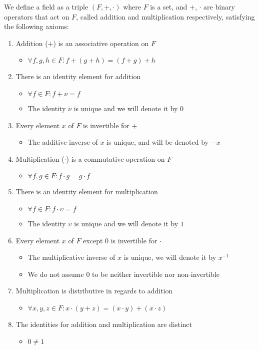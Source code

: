 \documentclass{article}
\begin{document}
We define a field as a triple $(F,+,\cdot)$ where $F$ is a set, and $+$, $\cdot$
are binary operators that act on $F$, called addition and multiplication
respectively, satisfying the following axioms\cite{field}:
\begin{enumerate}
  \item Addition ($+$) is an associative operation on $F$
  \begin{itemize}
    \item $\forall f,g,h \in F : f+(g+h) = (f+g)+h$
  \end{itemize}
  \item There is an identity element for addition
  \begin{itemize}
    \item $\forall f \in F: f + \nu = f$
    \item The identity $\nu$ is unique and we will denote it by   $0$
  \end{itemize}
  \item Every element $x$ of $F$ is invertible for $+$
  \begin{itemize}
    \item The additive inverse of $x$ is unique, and will be denoted by $-x$
  \end{itemize}
  \item Multiplication ($\cdot$) is a commutative operation on $F$
  \begin{itemize}
    \item $\forall f,g \in F : f \cdot g = g \cdot f$
  \end{itemize}
  \item There is an identity element for multiplication
  \begin{itemize}
    \item $\forall f \in F: f \cdot \upsilon = f$
    \item The identity $\upsilon$ is unique and we will denote it by $1$
  \end{itemize}
  \item Every element $x$ of $F$ except $0$ is invertible for $\cdot$
  \begin{itemize}
    \item The multiplicative inverse of $x$ is unique, we will denote it by
          $x^{-1}$
    \item We do not assume $0$ to be neither invertible nor non-invertible
  \end{itemize}
  \item Multiplication is distributive in regards to addition
  \begin{itemize}
    \item $\forall x,y,z \in F : x \cdot (y + z) = (x \cdot y) + (x \cdot z)$
  \end{itemize}
  \item The identities for addition and multiplication are distinct
  \begin{itemize}
    \item $0 \neq 1$
  \end{itemize}
\end{enumerate}
\end{document}
